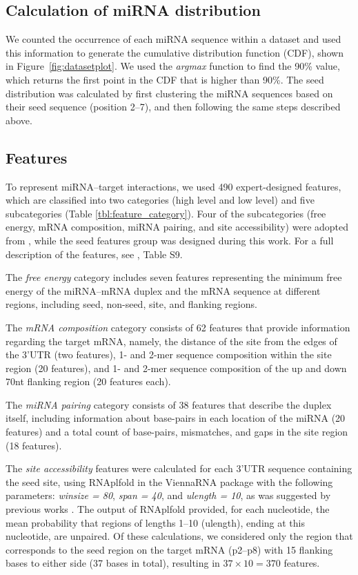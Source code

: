 \documentclass{bmcart}
\begin{document}
\subsection*{Calculation of miRNA distribution} \label{miRNAdistribution2}
We counted the occurrence of each miRNA sequence within a dataset and used this information to generate the cumulative distribution function (CDF), shown in Figure~\ref{fig:datasetplot}. We used the \textit{argmax} function to find the 90\% value, which returns the first point in the CDF that is higher than 90\%. 
The seed distribution was calculated by first clustering the miRNA sequences based on their seed sequence (position 2--7), and then following the same steps described above.


\subsection*{Features} \label{methods_features}
To represent miRNA--target interactions, we used 490 expert-designed features, which are classified into two categories (high level and low level) and five subcategories (Table \ref{tbl:feature_category}). Four of the subcategories (free energy, mRNA composition, miRNA pairing, and site accessibility) were adopted from \cite{wen2018deepmirtar}, while the seed features group was designed during this work. For a full description of the features, see ,  Table S9.



The \textit{free energy} category includes seven features representing the minimum free energy of the miRNA--mRNA duplex and the mRNA sequence at different regions, including seed, non-seed, site, and flanking regions. 

The \textit{mRNA composition} category consists of 62 features that provide information regarding the target mRNA, namely, the distance of the site from the edges of the 3'UTR (two features), 1- and 2-mer sequence composition within the site region (20 features), and 1- and 2-mer sequence composition of the up and down 70nt flanking region (20 features each). 

The \textit{miRNA pairing} category consists of 38 features that describe the duplex itself, including information about base-pairs in each location of the miRNA (20 features) and a total count of base-pairs, mismatches, and gaps in the site region (18 features).

The \textit{site accessibility} features were calculated for each 3'UTR sequence containing the seed site, using RNAplfold in the ViennaRNA package \cite{lorenz2011viennarna} with the following parameters:  \textit{winsize = 80}, \textit{span = 40}, and \textit{ulength = 10}, as was suggested by previous works \cite{menor2014mirmark, wen2018deepmirtar}. The output of RNAplfold provided, for each nucleotide, the mean probability that regions of lengths 1--10 (ulength), ending at this nucleotide, are unpaired. Of these calculations, we considered only the region that corresponds to the seed region on the target mRNA (p2–p8) with 15 flanking bases to either side (37 bases in total), resulting in $37 \times 10 = 370$ features.
\end{document}
